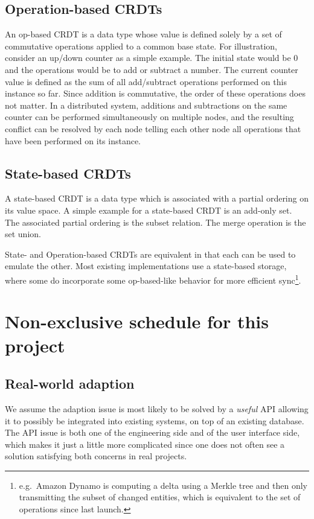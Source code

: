\documentclass[12pt,a4paper,notitlepage]{article}
\begin{document}
\subsection{Operation-based CRDTs}
An op-based CRDT is a data type whose value is defined solely by a set of commutative operations applied to a common
base state. For illustration, consider an up/down counter as a simple example. The initial state would be $0$ and the
operations would be to add or subtract a number. The current counter value is defined as the sum of all add/subtract
operations performed on this instance so far. Since addition is commutative, the order of these operations does not
matter. In a distributed system, additions and subtractions on the same counter can be performed simultaneously on
multiple nodes, and the resulting conflict can be resolved by each node telling each other node all operations that have
been performed on its instance.

\subsection{State-based CRDTs}
A state-based CRDT is a data type which is associated with a partial ordering on its value space. A simple example for a
state-based CRDT is an add-only set. The associated partial ordering is the subset relation. The merge operation is the
set union.

State- and Operation-based CRDTs are equivalent in that each can be used to emulate the other. Most existing
implementations use a state-based storage, where some do incorporate some op-based-like behavior %
for more efficient sync\footnote{e.g.\ Amazon Dynamo is computing a delta using a Merkle tree and then only transmitting
the subset of changed entities, which is equivalent to the set of operations since last launch.}.

\section{Non-exclusive schedule for this project}
\subsection{Real-world adaption}
We assume the adaption issue is most likely to be solved by a \emph{useful} API allowing it to possibly be integrated
into existing systems, on top of an existing database. The API issue is both one of the engineering side and of the user
interface side, which makes it just a little more complicated since one does not often see a solution satisfying both
concerns in real projects.
\end{document}

